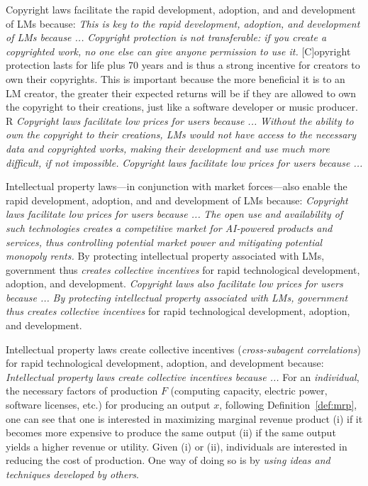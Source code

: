 \documentclass{article} %
\begin{document}
Copyright laws facilitate the rapid development, adoption, and and development of LMs because:    \emph{This is key to the rapid development, adoption, and development of LMs because ...} \emph{Copyright protection is not transferable: if you create a copyrighted work, no one else can give anyone permission to use it.} [C]opyright protection lasts for life plus 70 years and is thus a strong incentive for creators to own their copyrights. This is important because the more beneficial it is to an LM creator, the greater their expected returns will be if they are allowed to own the copyright to their creations, just like a software developer or music producer. R \emph{Copyright laws facilitate low prices for users because ...} \emph{Without the ability to own the copyright to their creations, LMs would not have access to the necessary data and copyrighted works, making their development and use much more difficult, if not impossible.} \emph{Copyright laws facilitate low prices for users because ...}

Intellectual property laws---in conjunction with market forces---also enable the rapid development, adoption, and and development of LMs because: \emph{Copyright laws facilitate low prices for users because ...} \emph{The open use and availability of such technologies creates a competitive market for AI-powered products and services, thus controlling potential market power and mitigating potential monopoly rents.} By protecting intellectual property associated with LMs, government thus \emph{creates collective incentives} for rapid technological development, adoption, and development. \emph{Copyright laws also facilitate low prices for users because ...} \emph{By protecting intellectual property associated with LMs, government thus creates collective incentives} for rapid technological development, adoption, and development.


Intellectual property laws create collective incentives (\emph{cross-subagent correlations}) for rapid technological development, adoption, and development because:  \emph{Intellectual property laws create collective incentives because ...}  For an \emph{individual}, the necessary factors of production $F$ (computing capacity, electric power, software licenses, etc.) for producing an output $x$, following Definition~\ref{def:mrp}, one can see that one is interested in maximizing marginal revenue product (i) if it becomes more expensive to produce the same output (ii) if the same output yields a higher revenue or utility. Given (i) or (ii), individuals are interested in reducing the cost of production. One way of doing so is by \emph{using ideas and techniques developed by others}.
\end{document}

